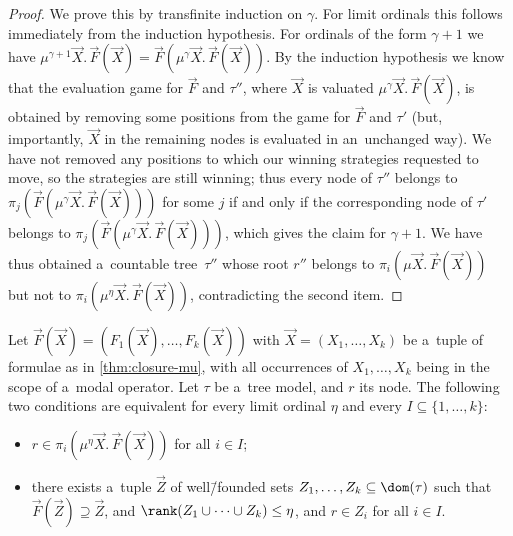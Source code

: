 \documentclass{lmcs}
\numberwithin{equation}{section}
\numberwithin{figure}{section}
\begin{document}
\begin{proof}
	We prove this by transfinite induction on $\gamma$.
	For limit ordinals this follows immediately from the induction hypothesis.
	For ordinals of the form $\gamma+1$ we have $\mu^{\gamma+1}\vec{X}.\,\vec{F}(\vec{X})=\vec{F}(\mu^\gamma\vec{X}.\,\vec{F}(\vec{X}))$.
	By the induction hypothesis we know that the evaluation game for $\vec{F}$ and $\tau''$,
	where $\vec{X}$ is valuated $\mu^\gamma\vec{X}.\,\vec{F}(\vec{X})$, is obtained by removing some positions from the game for $\vec{F}$ and $\tau'$
	(but, importantly, $\vec{X}$ in the remaining nodes is evaluated in an~unchanged way).
	We have not removed any positions to which our winning strategies requested to move, so the strategies are still winning;
	thus every node of $\tau''$ belongs to $\pi_j(\vec{F}(\mu^\gamma\vec{X}.\,\vec{F}(\vec{X})))$ for some $j$
	if and only if the corresponding node of $\tau'$ belongs to $\pi_j(\vec{F}(\mu^\gamma\vec{X}.\,\vec{F}(\vec{X})))$, which gives the claim for $\gamma+1$.
	We have thus obtained a~countable tree~$\tau''$ whose root $r''$ belongs to $\pi_i(\mu\vec{X}.\,\vec{F}(\vec{X}))$ but not to $\pi_i(\mu^\eta\vec{X}.\,\vec{F}(\vec{X}))$, contradicting the second item.
\end{proof}

\begin{lem}\label{lem:mu-tree2}
	Let $\vec{F}(\vec{X})=(F_1(\vec{X}),\dots,F_k(\vec{X}))$ with $\vec{X}=(X_1,\dots,X_k)$ be a~tuple of formulae as in \cref{thm:closure-mu}, with all occurrences of $X_1,\dots,X_k$ being in the scope of a~modal operator.
	Let $\tau$ be a~tree model, and $r$ its node.
	The following two conditions are equivalent for every limit ordinal $\eta$ and every $I\subseteq\{1,\dots,k\}$:
	\begin{itemize}
	\item	$r\in\pi_i(\mu^\eta\vec{X}.\,\vec{F}(\vec{X}))$ for all $i\in I$;
	\item	there exists a~tuple $\vec{Z}$ of well\=/founded sets $Z_1,\dots,Z_k\subseteq\dom(\tau)$
		such that $\vec{F}(\vec{Z})\supseteq\vec{Z}$, and $\rank(Z_1\cup\dots\cup Z_k)\leq\eta$, and $r\in Z_i$ for all $i\in I$.
	\end{itemize}
\end{lem}
\end{document}
